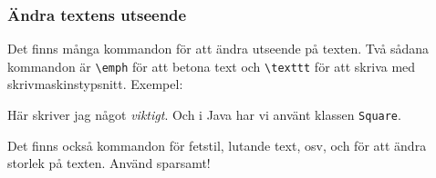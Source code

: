 
\begin{frame}[fragile=singleslide]
  \frametitle{Ändra textens utseende}
  Det finns många kommandon för att ändra utseende på texten. Två
  sådana kommandon  är \verb+\emph+ för att betona text och \verb+\texttt+
  för att skriva med skrivmaskinstypsnitt. Exempel:

  \begin{exempel}
    Här skriver jag något
    \emph{viktigt}. Och
    i Java har vi använt
    klassen \texttt{Square}.
  \end{exempel}

  Det finns också kommandon för fetstil, lutande text, osv, och för att
  ändra storlek på texten. Använd sparsamt!
\end{frame}

